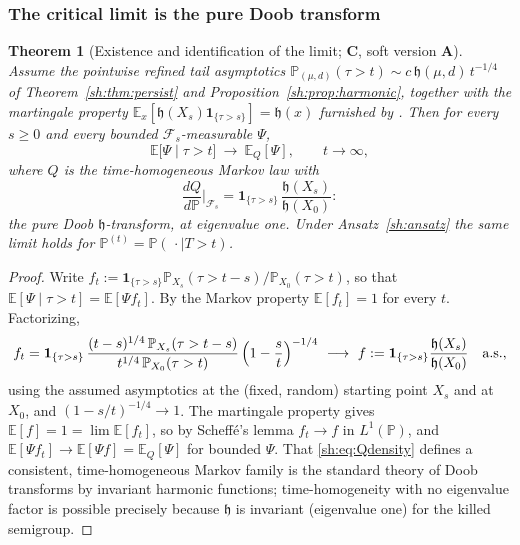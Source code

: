 \documentclass[11pt]{article}
\numberwithin{equation}{section}
\theoremstyle{plain}
\newtheorem{theorem}{Theorem}[section]
\theoremstyle{definition}
\theoremstyle{remark}
\newcommand{\E}{\mathbb{E}}
\newcommand{\PP}{\mathbb{P}}
\newcommand{\one}{\mathbf{1}}
\newcommand{\Fc}{\mathcal{F}}
\newcommand{\hm}{\mathfrak{h}}
\begin{document}
\subsubsection{The critical limit is the pure Doob transform}
\label{sh:subsub:Q}

\begin{theorem}[Existence and identification of the limit;
\textbf{C}, soft version \textbf{A}]\label{sh:thm:Q}
Assume the pointwise refined tail asymptotics
$\PP_{(\mu,d)}(\tau>t)\sim c\,\hm(\mu,d)\,t^{-1/4}$ of
Theorem~\ref{sh:thm:persist} and
Proposition~\ref{sh:prop:harmonic}, together with the martingale property
$\E_{x}[\hm(X_s)\one_{\{\tau>s\}}]=\hm(x)$ furnished by \cite{GJW99}.
Then for every $s\ge0$ and every bounded $\Fc_s$-measurable $\Psi$,
\[
\E\bigl[\Psi\mid\tau>t\bigr]\ \longrightarrow\ \E_Q[\Psi],
\qquad t\to\infty,
\]
where $Q$ is the time-homogeneous Markov law with
\begin{equation}\label{sh:eq:Qdensity}
\frac{dQ}{d\PP}\Big|_{\Fc_s}
=\one_{\{\tau>s\}}\,\frac{\hm(X_s)}{\hm(X_0)} :
\end{equation}
the \emph{pure} Doob $\hm$-transform, at eigenvalue one. Under
Ansatz~\ref{sh:ansatz} the same limit holds for
$\PP^{(t)}=\PP(\,\cdot\mid T>t)$.
\end{theorem}

\begin{proof}
Write $f_t:=\one_{\{\tau>s\}}\PP_{X_s}(\tau>t-s)/\PP_{X_0}(\tau>t)$, so
that $\E[\Psi\mid\tau>t]=\E[\Psi f_t]$. By the Markov property
$\E[f_t]=1$ for every $t$. Factorizing,
\[
f_t=\one_{\{\tau>s\}}\,
\frac{(t-s)^{1/4}\,\PP_{X_s}(\tau>t-s)}{t^{1/4}\,\PP_{X_0}(\tau>t)}
\,\Bigl(1-\frac st\Bigr)^{-1/4}
\ \longrightarrow\
f:=\one_{\{\tau>s\}}\frac{\hm(X_s)}{\hm(X_0)}
\quad\text{a.s.},
\]
using the assumed asymptotics at the (fixed, random) starting point
$X_s$ and at $X_0$, and $(1-s/t)^{-1/4}\to1$. The martingale property
gives $\E[f]=1=\lim\E[f_t]$, so by Scheff\'e's lemma $f_t\to f$ in
$L^1(\PP)$, and $\E[\Psi f_t]\to\E[\Psi f]=\E_Q[\Psi]$ for bounded
$\Psi$. That \eqref{sh:eq:Qdensity} defines a consistent, time-homogeneous
Markov family is the standard theory of Doob transforms by invariant
harmonic functions; time-homogeneity with no eigenvalue factor is
possible precisely because $\hm$ is invariant (eigenvalue one) for the
killed semigroup.
\end{proof}
\end{document}
